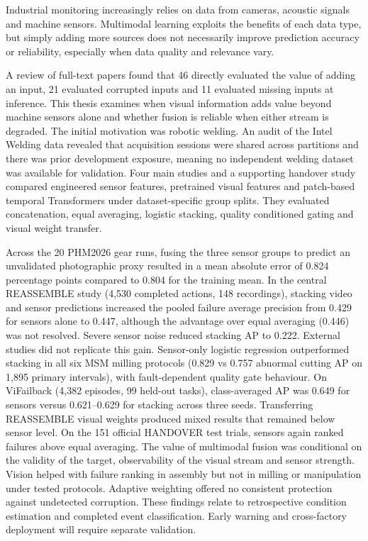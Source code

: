 
Industrial monitoring increasingly relies on data from cameras, acoustic signals and
machine sensors. Multimodal learning exploits the benefits of each data type, but simply
adding more sources does not necessarily improve prediction accuracy or reliability,
especially when data quality and relevance vary.

A review of \ReviewWorkCount{} full-text papers found
that 46 directly evaluated the value of adding an input, 21 evaluated corrupted inputs
and 11 evaluated missing inputs at inference. This thesis examines when visual
information adds value beyond machine sensors alone and whether fusion is reliable when
either stream is degraded. The initial motivation was robotic welding. An audit of the
Intel Welding data revealed that acquisition sessions were shared across partitions and
there was prior development exposure, meaning no independent welding dataset was available for
validation. Four main studies and a supporting handover study compared engineered sensor
features, pretrained visual features and patch-based temporal Transformers under
dataset-specific group splits. They evaluated concatenation, equal averaging, logistic
stacking, quality conditioned gating and visual weight transfer.

Across the 20 PHM2026
gear runs, fusing the three sensor groups to predict an unvalidated photographic proxy
resulted in a mean absolute error of 0.824 percentage points compared to 0.804 for the
training mean. In the central REASSEMBLE study (4,530 completed actions, 148
recordings), stacking video and sensor predictions increased the pooled failure average
precision  from 0.429 for sensors alone to 0.447, although the advantage over equal
averaging (0.446) was not resolved. Severe sensor noise reduced stacking AP to 0.222.
External studies did not replicate this gain. Sensor-only logistic regression
outperformed stacking in all six MSM milling protocols (0.829 vs 0.757 abnormal cutting
AP on 1,895 primary intervals), with fault-dependent quality gate behaviour. On
ViFailback (4,382 episodes, 99 held-out tasks), class-averaged AP was 0.649 for sensors
versus 0.621--0.629 for stacking across three seeds. Transferring REASSEMBLE visual
weights produced mixed results that remained below sensor level. On the 151 official
HANDOVER test trials, sensors again ranked failures above equal averaging. The value of
multimodal fusion was conditional on the validity of the target, observability of the
visual stream and sensor strength. Vision helped with failure ranking in assembly but
not in milling or manipulation under tested protocols. Adaptive weighting offered no
consistent protection against undetected corruption. These findings relate to
retrospective condition estimation and completed event classification. Early warning and
cross-factory deployment will require separate validation.
